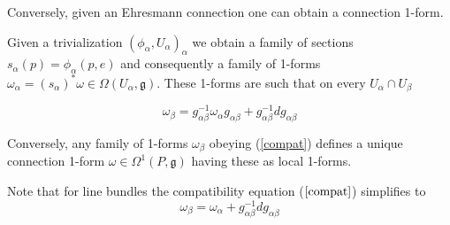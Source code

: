 Conversely, given an Ehresmann connection one can obtain a connection 1-form.


% 
% 
% 
% 

Given a trivialization $(\phi_\alpha,U_\alpha)_\alpha$ we obtain a family of sections $s_\alpha(p)=\phi_\alpha(p,e)$ and consequently a  family of 1-forms $\omega_\alpha=(s_\alpha)^*\omega\in \Omega(U_\alpha,\mathfrak{g})$. These 1-forms are such that on every $U_\alpha\cap U_\beta$

\begin{equation}
\label{compat}
\omega_\beta = g_{\alpha\beta}^{-1} \omega_\alpha g_{\alpha\beta}+g_{\alpha\beta}^{-1}dg_{\alpha\beta}
\end{equation}

Conversely, any family of 1-forms $\omega_\beta$ obeying (\ref{compat}) defines a unique connection 1-form $\omega\in\Omega^1(P,\mathfrak{g})$ having these as local 1-forms. 

Note that for line bundles the compatibility equation ($\ref{compat}$) simplifies to
\begin{equation}
 \label{compat2} \omega_\beta = \omega_\alpha+g_{\alpha\beta}^{-1}dg_{\alpha\beta}
\end{equation}


 
                                                                                                                                                                                                            
                                                                                                                                


